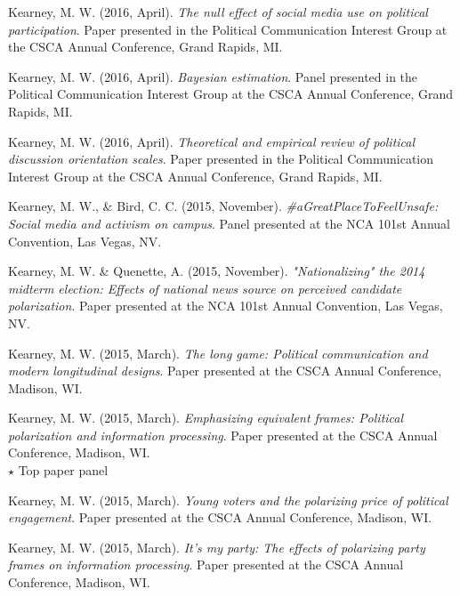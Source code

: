 \documentclass[11pt,letterpaper]{article}
\begin{document}
\begin{bibenum}
    \item[] Kearney, M. W. (2016, April). \textit{The null effect of social
      media use on political participation}. Paper presented in the
      Political Communication Interest Group at the CSCA Annual
      Conference, Grand Rapids, MI.

    \item[] Kearney, M. W. (2016, April).
      \textit{Bayesian estimation}.
      Panel presented in the Political Communication Interest
      Group at the CSCA Annual Conference, Grand Rapids, MI.

    \item[] Kearney, M. W. (2016, April).
      \textit{Theoretical and empirical review of political discussion
      orientation scales}. Paper presented in the Political
      Communication Interest Group at the CSCA Annual Conference, Grand
      Rapids, MI.

    \item[] Kearney, M. W., \& Bird, C. C. (2015, November).
      \textit{\#aGreatPlaceToFeelUnsafe: Social media and activism on campus}.
      Panel presented at the NCA 101st Annual Convention, Las Vegas, NV.

    \item[] Kearney, M. W. \& Quenette, A. (2015, November).
      \textit{"Nationalizing" the 2014 midterm election:
      Effects of national news source on perceived candidate
      polarization}. Paper presented at the NCA 101st Annual Convention,
      Las Vegas, NV.

    \item[] Kearney, M. W. (2015, March).
      \textit{The long game: Political communication and modern longitudinal
      designs}.
      Paper presented at the CSCA Annual Conference, Madison, WI.

    \item[] Kearney, M. W. (2015, March).
      \textit{Emphasizing equivalent frames: Political polarization and
      information processing}. Paper presented at the CSCA Annual
      Conference, Madison, WI.\\
      {$\star$} Top paper panel

    \item[] Kearney, M. W. (2015, March).
      \textit{Young voters and the polarizing price of political engagement}.
      Paper presented at the CSCA Annual Conference, Madison, WI.

    \item[] Kearney, M. W. (2015, March).
      \textit{It's my party: The effects of polarizing party frames on
      information processing}.
      Paper presented at the CSCA Annual Conference, Madison, WI.


\end{bibenum}
\end{document}
